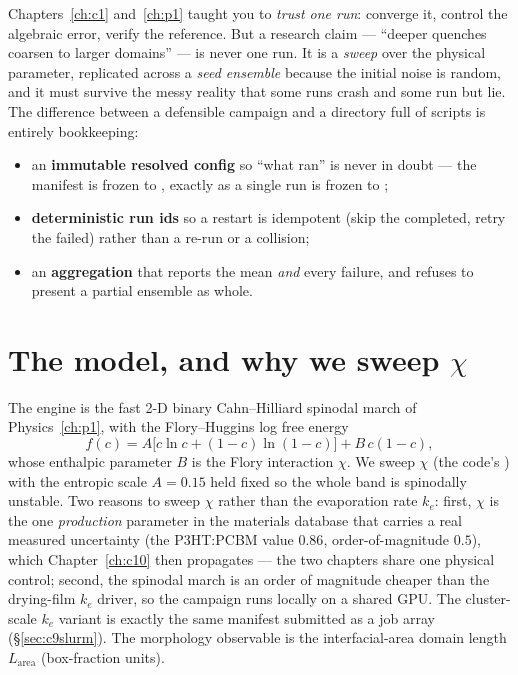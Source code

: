 Chapters~\ref{ch:c1} and~\ref{ch:p1} taught you to \emph{trust one run}:
converge it, control the algebraic error, verify the reference. But a
research claim --- ``deeper quenches coarsen to larger domains'' --- is
never one run. It is a \emph{sweep} over the physical parameter, replicated
across a \emph{seed ensemble} because the initial noise is random, and it
must survive the messy reality that some runs crash and some run but lie.
The difference between a defensible campaign and a directory full of
scripts is entirely bookkeeping:
\begin{itemize}[nosep]
  \item an \textbf{immutable resolved config} so ``what ran'' is never in
        doubt --- the manifest is frozen to ,
        exactly as a single run is frozen to ;
  \item \textbf{deterministic run ids} so a restart is idempotent (skip the
        completed, retry the failed) rather than a re-run or a collision;
  \item an \textbf{aggregation} that reports the mean \emph{and} every
        failure, and refuses to present a partial ensemble as whole.
\end{itemize}

\section{The model, and why we sweep \texorpdfstring{$\chi$}{chi}}

The engine is the fast 2-D binary Cahn--Hilliard spinodal march of
Physics~\ref{ch:p1}, with the Flory--Huggins log free energy
%
\begin{equation}
  f(c) = A\big[c\ln c + (1-c)\ln(1-c)\big] + B\,c(1-c),
\end{equation}
%
whose enthalpic parameter $B$ is the Flory interaction $\chi$. We sweep
$\chi$ (the code's ) with the entropic scale
$A=0.15$ held fixed so the whole band is spinodally unstable. Two reasons
to sweep $\chi$ rather than the evaporation rate $k_e$: first, $\chi$ is
the one \emph{production} parameter in the materials database that carries
a real measured uncertainty (the P3HT:PCBM value $0.86$, order-of-magnitude
$0.5$), which Chapter~\ref{ch:c10} then propagates --- the two chapters
share one physical control; second, the spinodal march is an order of
magnitude cheaper than the drying-film $k_e$ driver, so the campaign runs
locally on a shared GPU. The cluster-scale $k_e$ variant is exactly the
same manifest submitted as a job array (\S\ref{sec:c9slurm}). The
morphology observable is the interfacial-area domain length
$L_{\mathrm{area}}$ (box-fraction units).

